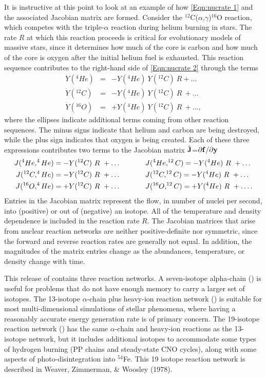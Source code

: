 It is instructive at this point to look at an example of how
\eqref{Eqn:nucrate 1} and the associated Jacobian matrix are
formed. Consider the $^{12}$C($\alpha$,$\gamma$)$^{16}$O reaction,
which competes with the triple-$\alpha$ reaction during helium
burning in stars. The rate $R$ at which this reaction proceeds is
critical for evolutionary models of massive stars, since it
determines how much of the core is carbon and how much of the core
is oxygen after the initial helium fuel is exhausted.  This reaction
sequence contributes to the right-hand side of \eqref{Eqn:nucrate
2} through the terms
\begin{eqnarray}
\nonumber
\dot {Y} (^4He)   & =& - Y(^4He) \ Y(^{12}C) \ R + \ldots \\
\dot {Y} (^{12}C) & =& - Y(^4He) \ Y(^{12}C) \ R \ + \ldots  \\
\nonumber
\dot {Y} (^{16}O) & =& + Y(^4He) \ Y(^{12}C) \ R \ + \ldots ,
\end{eqnarray}
where the ellipses indicate additional terms coming from other
reaction sequences.  The minus signs indicate that helium and carbon
are being destroyed, while the plus sign indicates that oxygen is
being created. Each of these three expressions contributes two terms
to the Jacobian matrix
${\tilde {\bf J}}$=$\partial{{\bf f}}/\partial{{\bf y}}$
\begin{eqnarray}
\nonumber
J(^4He,^4He)     = - Y(^{12}C) \ R \ + \ldots  \hskip 0.5in
&
J(^4He,^{12}C)   = - Y(^4He) \ R \ + \ldots \\
J(^{12}C,^4He)   = - Y(^{12}C) \ R \ + \ldots \hskip 0.5in
&
J(^{12}C,^{12}C) = - Y(^4He) \ R \ + \ldots   \\
\nonumber
J(^{16}O,^4He)   = + Y(^{12}C) \ R \ + \ldots \hskip 0.5in
&
J(^{16}O,^{12}C) = + Y(^4He) \ R \ + \ldots .
\end{eqnarray}
Entries in the Jacobian matrix represent the flow, in number of nuclei
per second, into (positive) or out of (negative) an isotope.  All of the
temperature and density dependence is included in the reaction rate
$R$.  The Jacobian matrices that arise from nuclear reaction networks
are neither positive-definite nor symmetric, since the forward and
reverse reaction rates are generally not equal. In addition, the
magnitudes of the matrix entries change as the abundances,
temperature, or density change with time.

This release of \flashx contains three reaction networks.
A seven-isotope alpha-chain () is useful for problems that
do not have enough memory to carry a larger set of isotopes.
The 13-isotope $\alpha$-chain plus heavy-ion reaction network ()
is suitable for most multi-dimensional simulations of stellar phenomena,
where having a reasonably accurate energy generation rate is of primary
concern.  The 19-isotope reaction network () has the same
$\alpha$-chain and heavy-ion reactions as the 13-isotope network, but it
includes additional isotopes to accommodate some types of hydrogen burning
(PP chains and steady-state CNO cycles), along with some aspects of
photo-disintegration into $^{54}$Fe. This 19 isotope reaction network
is described in Weaver, Zimmerman, \& Woosley (1978).

